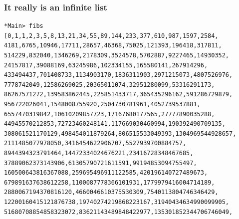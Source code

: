 \documentclass{beamer}
\begin{document}
\begin{frame}[fragile]
\frametitle{It really is an infinite list}

{\footnotesize
\begin{verbatim}
*Main> fibs
[0,1,1,2,3,5,8,13,21,34,55,89,144,233,377,610,987,1597,2584,
4181,6765,10946,17711,28657,46368,75025,121393,196418,317811,
514229,832040,1346269,2178309,3524578,5702887,9227465,14930352,
24157817,39088169,63245986,102334155,165580141,267914296,
433494437,701408733,1134903170,1836311903,2971215073,4807526976,
7778742049,12586269025,20365011074,32951280099,53316291173,
86267571272,139583862445,225851433717,365435296162,591286729879,
956722026041,1548008755920,2504730781961,4052739537881,
6557470319842,10610209857723,17167680177565,27777890035288,
44945570212853,72723460248141,117669030460994,190392490709135,
308061521170129,498454011879264,806515533049393,1304969544928657,
2111485077978050,3416454622906707,5527939700884757,
8944394323791464,14472334024676221,23416728348467685,
37889062373143906,61305790721611591,99194853094755497,
160500643816367088,259695496911122585,420196140727489673,
679891637638612258,1100087778366101931,1779979416004714189,
2880067194370816120,4660046610375530309,7540113804746346429,
12200160415121876738,19740274219868223167,31940434634990099905,
51680708854858323072,83621143489848422977,135301852344706746049,
\end{verbatim}
}

\end{frame}

\end{document}
